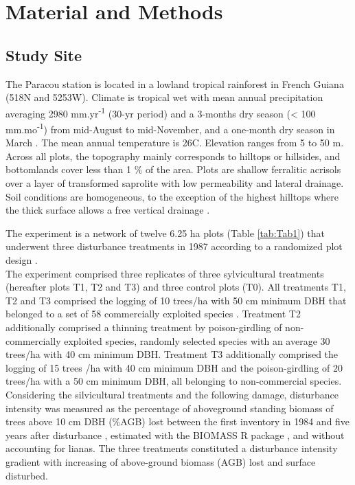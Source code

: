 \documentclass[fleqn,10pt]{ArtEcoFoG} %
\begin{document}
\section{Material and Methods}\label{material-and-methods}

\subsection{Study Site}\label{study-site}

The Paracou station is located in a lowland tropical rainforest in
French Guiana (518\textdegree N and 5253\textdegree W). Climate is
tropical wet with mean annual precipitation averaging 2980
mm.yr\textsuperscript{-1} (30-yr period) and a 3-months dry season
(\textless{} 100 mm.mo\textsuperscript{-1}) from mid-August to
mid-November, and a one-month dry season in March \citep{Wagner2011}.
The mean annual temperature is 26\textdegree C. Elevation ranges from 5
to 50 m. Across all plots, the topography mainly corresponds to hilltops
or hillsides, and bottomlands cover less than 1 \% of the area. Plots
are shallow ferralitic acrisols over a layer of transformed saprolite
with low permeability and lateral drainage. Soil conditions are
homogeneous, to the exception of the highest hilltops where the thick
surface allows a free vertical drainage \citep{Gourlet-Fleury2004}.

The experiment is a network of twelve 6.25 ha plots (Table
\ref{tab:Tab1}) that underwent three disturbance treatments in 1987
according to a randomized plot design \citep{Herault2018}.\\
The experiment comprised three replicates of three sylvicultural
treatments (hereafter plots T1, T2 and T3) and three control plots (T0).
All treatments T1, T2 and T3 comprised the logging of 10 trees/ha with
50 cm minimum DBH that belonged to a set of 58 commercially exploited
species \citep{Gourlet-Fleury2004}. Treatment T2 additionally comprised
a thinning treatment by poison-girdling of non-commercially exploited
species, randomly selected species with an average 30 trees/ha with 40
cm minimum DBH. Treatment T3 additionally comprised the logging of 15
trees /ha with 40 cm minimum DBH and the poison-girdling of 20 trees/ha
with a 50 cm minimum DBH, all belonging to non-commercial species.
Considering the silvicultural treatments and the following damage,
disturbance intensity was measured as the percentage of aboveground
standing biomass of trees above 10 cm DBH (\%AGB) lost between the first
inventory in 1984 and five years after disturbance \citep{Piponiot2016},
estimated with the BIOMASS R package \citep{Biomass2018}, and without
accounting for lianas. The three treatments constituted a disturbance
intensity gradient with increasing of above-ground biomass (AGB) lost
and surface disturbed.
\end{document}
